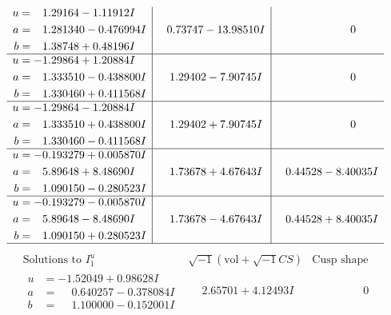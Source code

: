 \documentclass[1p]{elsarticle_modified}
\theoremstyle{definition}
\newcommand{\I}{\sqrt{-1}}
\begin{document}
$$\begin{array}{c|c|c}
\begin{aligned}
u &= \phantom{-}1.29164 - 1.11912 I \\
a &= \phantom{-}1.281340 - 0.476994 I \\
b &= \phantom{-}1.38748 + 0.48196 I\end{aligned}
 & \phantom{-}0.73747 - 13.98510 I & \phantom{-0.000000 } 0 \\ \hline\begin{aligned}
u &= -1.29864 + 1.20884 I \\
a &= \phantom{-}1.333510 - 0.438800 I \\
b &= \phantom{-}1.330460 + 0.411568 I\end{aligned}
 & \phantom{-}1.29402 - 7.90745 I & \phantom{-0.000000 } 0 \\ \hline\begin{aligned}
u &= -1.29864 - 1.20884 I \\
a &= \phantom{-}1.333510 + 0.438800 I \\
b &= \phantom{-}1.330460 - 0.411568 I\end{aligned}
 & \phantom{-}1.29402 + 7.90745 I & \phantom{-0.000000 } 0 \\ \hline\begin{aligned}
u &= -0.193279 + 0.005870 I \\
a &= \phantom{-}5.89648 + 8.48690 I \\
b &= \phantom{-}1.090150 - 0.280523 I\end{aligned}
 & \phantom{-}1.73678 + 4.67643 I & \phantom{-}0.44528 - 8.40035 I \\ \hline\begin{aligned}
u &= -0.193279 - 0.005870 I \\
a &= \phantom{-}5.89648 - 8.48690 I \\
b &= \phantom{-}1.090150 + 0.280523 I\end{aligned}
 & \phantom{-}1.73678 - 4.67643 I & \phantom{-}0.44528 + 8.40035 I\\
 \hline 
 \end{array}$$\newpage$$\begin{array}{c|c|c}  
\text{Solutions to }I^u_{1}& \I (\text{vol} + \sqrt{-1}CS) & \text{Cusp shape}\\
 \hline 
\begin{aligned}
u &= -1.52049 + 0.98628 I \\
a &= \phantom{-}0.640257 - 0.378084 I \\
b &= \phantom{-}1.100000 - 0.152001 I\end{aligned}
 & \phantom{-}2.65701 + 4.12493 I & \phantom{-0.000000 } 0 \\ \hline\begin{aligned}

\end{aligned}
\end{array}$$
\end{document}
